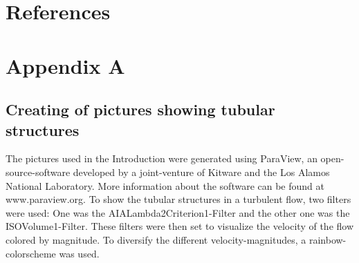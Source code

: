 \documentclass[11pt,a4paper,openany,oneside,parskip=half*]{article}
\begin{document}
\section{References}
\nocite{*} %
\pagebreak
\section{Appendix A}
\subsection*{Creating of pictures showing tubular structures}
The pictures used in the Introduction were generated using ParaView, an open-source-software developed by a joint-venture of Kitware and the Los Alamos National Laboratory. More information about the software can be found at www.paraview.org. To show the tubular structures in a turbulent flow, two filters were used: One was the AIALambda2Criterion1-Filter and the other one was the ISOVolume1-Filter. These filters were then set to visualize the velocity of the flow colored by magnitude. To diversify the different velocity-magnitudes, a rainbow-colorscheme was used. 
\end{document}
